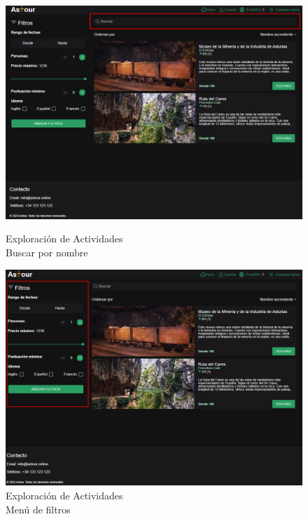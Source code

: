 \begin{figure}[H]
	\centering
	\begin{minipage}{0.45\textwidth}
		\centering
		\includegraphics[width=1\textwidth]{7-Construccion/Manuales/web/buscar nombre.png}
		\caption{Exploración de Actividades \\ Buscar por nombre}
		\label{fig:buscar-nombre}
	\end{minipage}
	\hfill
	\begin{minipage}{0.45\textwidth}
		\centering
		\includegraphics[width=1\textwidth]{7-Construccion/Manuales/web/menu filtros.png}
		\caption{Exploración de Actividades \\ Menú de filtros}
		\label{fig:filtros-menu}
	\end{minipage}
\end{figure}


